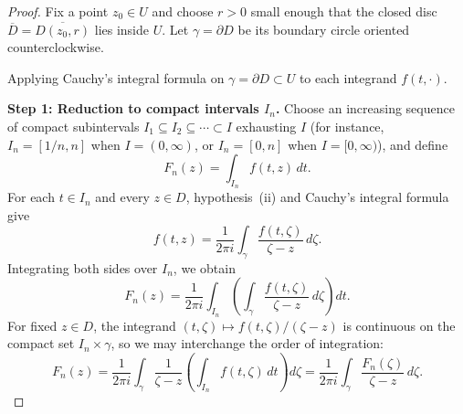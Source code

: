 \documentclass[11pt]{article}
\theoremstyle{plain}
\theoremstyle{definition}
\theoremstyle{boldremark}
\theoremstyle{remark}
\numberwithin{equation}{section}
\newenvironment{lecturefigure}
 {\par\addvspace{0.25em}\begingroup\setlength{\parskip}{0pt}\centering}
 {\par\endgroup\addvspace{0.25em}}
\begin{document}
\begin{proof}
Fix a point $z_0\in U$ and choose $r>0$ small enough that the closed disc
$\overline{D}=\overline{D(z_0,r)}$ lies inside $U$. Let $\gamma=\partial D$
be its boundary circle oriented counterclockwise.

\begin{lecturefigure}

{\small Applying Cauchy's integral formula on $\gamma=\partial D\subset U$
to each integrand $f(t,\cdot)$.}
\end{lecturefigure}

\textbf{Step 1: Reduction to compact intervals $I_n$.}
Choose an increasing sequence of compact subintervals
$I_1\subseteq I_2\subseteq\cdots\subset I$ exhausting $I$ (for instance,
$I_n=[1/n,n]$ when $I=(0,\infty)$, or $I_n=[0,n]$ when $I=[0,\infty)$), and
define
\[
 F_n(z) = \int_{I_n} f(t,z)\,dt.
\]
For each $t\in I_n$ and every $z\in D$, hypothesis~(ii) and Cauchy's
integral formula give
\[
 f(t,z) = \frac{1}{2\pi i}\int_{\gamma}\frac{f(t,\zeta)}{\zeta-z}\,d\zeta.
\]
Integrating both sides over $I_n$, we obtain
\[
 F_n(z) = \frac{1}{2\pi i}\int_{I_n}
          \left(\int_{\gamma}\frac{f(t,\zeta)}{\zeta-z}\,d\zeta\right)dt.
\]
For fixed $z\in D$, the integrand $(t,\zeta)\mapsto f(t,\zeta)/(\zeta-z)$ is
continuous on the compact set $I_n\times\gamma$, so we may interchange the
order of integration:
\begin{equation}\label{eq:Fn-cif}
 F_n(z) = \frac{1}{2\pi i}\int_{\gamma}
          \frac{1}{\zeta-z}\left(\int_{I_n} f(t,\zeta)\,dt\right)d\zeta
        = \frac{1}{2\pi i}\int_{\gamma}\frac{F_n(\zeta)}{\zeta-z}\,d\zeta.
\end{equation}


\end{proof}
\end{document}
